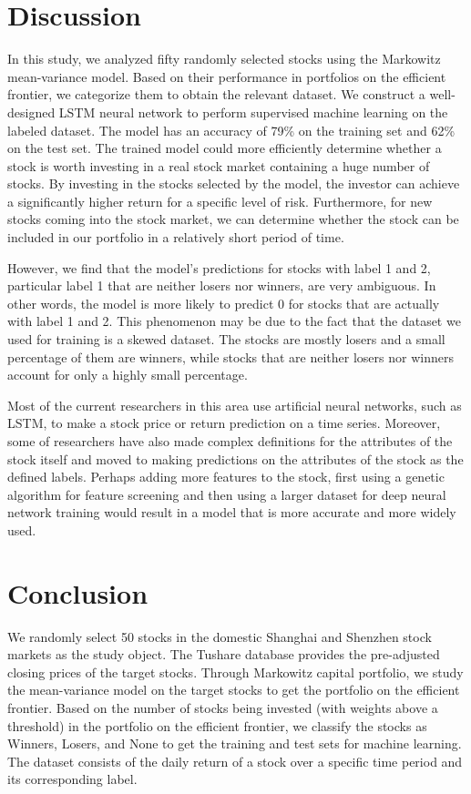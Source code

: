 \documentclass[default,iicol]{sn-jnl}%
\begin{document}
\section{Discussion}\label{sec7}
\hspace{1.5em}In this study, we analyzed fifty randomly selected stocks using the Markowitz mean-variance model. Based on their performance in portfolios on the efficient frontier, we categorize them to obtain the relevant dataset. We construct a well-designed LSTM neural network to perform supervised machine learning on the labeled dataset. The model has an accuracy of 79\% on the training set and 62\% on the test set. The trained model could more efficiently determine whether a stock is worth investing in a real stock market containing a huge number of stocks. By investing in the stocks selected by the model, the investor can achieve a significantly higher return for a specific level of risk. Furthermore, for new stocks coming into the stock market, we can determine whether the stock can be included in our portfolio in a relatively short period of time.

However, we find that the model's predictions for stocks with label 1 and 2, particular label 1 that are neither losers nor winners, are very ambiguous. In other words, the model is more likely to predict 0 for stocks that are actually with label 1 and 2. This phenomenon may be due to the fact that the dataset we used for training is a skewed dataset. The stocks are mostly losers and a small percentage of them are winners, while stocks that are neither losers nor winners account for only a highly small percentage.

Most of the current researchers in this area use artificial neural networks, such as LSTM, to make a stock price or return prediction on a time series. Moreover, some of researchers have also made complex definitions for the attributes of the stock itself and moved to making predictions on the attributes of the stock as the defined labels. Perhaps adding more features to the stock, first using a genetic algorithm for feature screening and then using a larger dataset for deep neural network training would result in a model that is more accurate and more widely used.
\section{Conclusion}\label{sec8}
\hspace{1.5em}We randomly select 50 stocks in the domestic Shanghai and Shenzhen stock markets as the study object. The Tushare database provides the pre-adjusted closing prices of the target stocks. Through Markowitz capital portfolio, we study the mean-variance model on the target stocks to get the portfolio on the efficient frontier. Based on the number of stocks being invested (with weights above a threshold) in the portfolio on the efficient frontier, we classify the stocks as Winners, Losers, and None to get the training and test sets for machine learning. The dataset consists of the daily return of a stock over a specific time period and its corresponding label.
\end{document}
